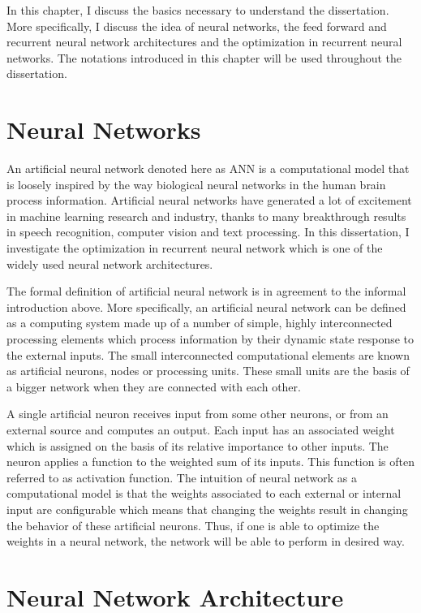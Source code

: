 In this chapter, I discuss the basics necessary to understand the dissertation. More specifically, I discuss the idea of neural networks, the feed forward and recurrent neural network architectures and the optimization in recurrent neural networks. The notations introduced in this chapter will be used throughout the dissertation. 
 
\section{Neural Networks}

An artificial neural network denoted here as ANN is a computational model that is loosely inspired by the way biological neural networks in the human brain process information. Artificial neural networks have generated a lot of excitement in machine learning research and industry, thanks to many breakthrough results in speech recognition, computer vision and text processing. In this dissertation, I investigate the optimization in recurrent neural network which is one of the widely used neural network architectures.

The formal definition of artificial neural network is in agreement to the informal introduction above. More specifically, an artificial neural network can be defined as a computing system made up of a number of simple, highly interconnected processing elements which process information by their dynamic state response to the external inputs. The small interconnected computational elements are known as artificial neurons, nodes or processing units. These small units are the basis of a bigger network when they are connected with each other.

A single artificial neuron receives input from some other neurons, or from an external source and computes an output. Each input has an associated weight which is assigned on the basis of its relative importance to other inputs. The neuron applies a function to the weighted sum of its inputs. This function is often referred to as activation function. The intuition of neural network as a computational model is that the weights associated to each external or internal input are configurable which means that changing the weights result in changing the behavior of these artificial neurons. Thus, if one is able to optimize the weights in a neural network, the network will be able to perform in desired way.

\section{Neural Network Architecture}

